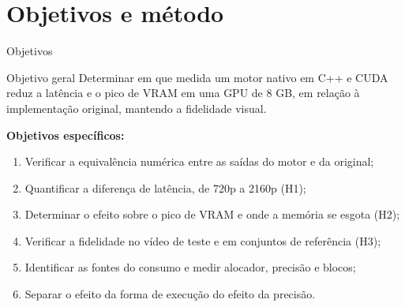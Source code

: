 \documentclass[
    aspectratio=169,
    12pt,
    brazil,
    xcolor=table
]{beamer}
\begin{document}
\section{Objetivos e método}
\begin{frame}{Objetivos}
  \footnotesize
  \begin{block}{Objetivo geral}
    Determinar em que medida um motor nativo em C++ e CUDA reduz a latência e o pico de VRAM em uma GPU de 8 GB, em relação à implementação original, mantendo a fidelidade visual.
  \end{block}
  \vspace{2pt}
  \textbf{Objetivos específicos:}
  \begin{enumerate}
    \item Verificar a equivalência numérica entre as saídas do motor e da original;
    \item Quantificar a diferença de latência, de 720p a 2160p (H1);
    \item Determinar o efeito sobre o pico de VRAM e onde a memória se esgota (H2);
    \item Verificar a fidelidade no vídeo de teste e em conjuntos de referência (H3);
    \item Identificar as fontes do consumo e medir alocador, precisão e blocos;
    \item Separar o efeito da forma de execução do efeito da precisão.
  \end{enumerate}
\end{frame}
\end{document}

